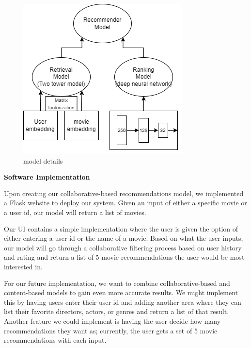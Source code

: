 \documentclass{article}
\begin{document}
\begin{figure}[H]
    \centering
    \includegraphics[width=.5\textwidth]{image/model_details.png}
    \caption{model details}
  \end{figure}

\vspace{0.3cm}



\vspace{2.5cm}

    \begin{flushleft}
        \textbf{\LARGE Software Implementation}
    \end{flushleft}

\vspace{0.3cm}

Upon creating our collaborative-based recommendations model, we implemented a Flask website to deploy our system. Given an input of either a specific movie or a user id, our model will return a list of movies. 

\vspace{0.3cm}

Our UI contains a simple implementation where the user is given the option of either entering a user id or the name of a movie. Based on what the user inputs, our model will go through a collaborative filtering process based on user history and rating and return a list of 5 movie recommendations the user would be most interested in.

\vspace{0.3cm}

For our future implementation, we want to combine collaborative-based and content-based models to gain even more accurate results. We might implement this by having users enter their user id and adding another area where they can list their favorite directors, actors, or genres and return a list of that result. Another feature we could implement is having the user decide how many recommendations they want as; currently, the user gets a set of 5 movie recommendations with each input.
\end{document}

